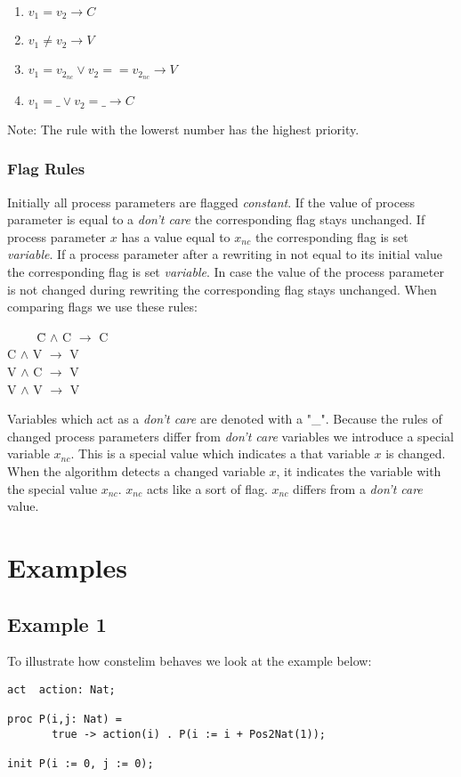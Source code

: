 \documentclass[a4paper,9pt]{article}
\begin{document}
\begin{enumerate}
\item $ v_{1} = v_{2} \rightarrow C $
\item $ v_{1} \neq v_{2} \rightarrow V $
\item $ v_{1} = v_{2_{nc}} \vee v_{2} == v_{2_{nc}} \rightarrow V$
\item $ v_{1} = \_  \vee v_{2} = \_ \rightarrow C $
\end{enumerate}
Note: The rule with the lowerst number has the highest priority.

\subsubsection*{Flag Rules} 
Initially all process parameters are flagged \textit{constant}.
If the value of process parameter is equal to a \textit{don't care} the corresponding flag stays unchanged.
If process parameter $x$ has a value equal to $x_{nc}$ the corresponding flag is set \textit{variable}.
If a process parameter after a rewriting in not equal to its initial value the corresponding flag is set \textit{variable}.
In case the value of the process parameter is not changed during rewriting the corresponding flag stays unchanged.
When comparing flags we use these rules: 
\begin{tabbing}
\verb"    " \= C $\wedge$ C $\rightarrow$ C \\
\> C $\wedge$ V $\rightarrow$ V \\
\> V $\wedge$ C $\rightarrow$ V \\
\> V $\wedge$ V $\rightarrow$ V \\
\end{tabbing}

Variables which act as a \textit{don't care} are denoted with a "\_". 
Because the rules of changed process parameters differ from \textit{don't care} variables we introduce 
a special variable $x_{nc}$. This is a special value which indicates a that variable $x$ is changed. 
When the algorithm detects a changed variable $x$, it indicates the variable with the special 
value $x_{nc}$. $x_{nc}$ acts like a sort of flag. $x_{nc}$ differs from a \textit{don't care} value. 

\section{Examples}
\subsection{Example 1}
To illustrate how constelim behaves we look at the example below:
\begin{verbatim}
act  action: Nat;

proc P(i,j: Nat) =
       true -> action(i) . P(i := i + Pos2Nat(1));

init P(i := 0, j := 0);
\end{verbatim}
\end{document}
